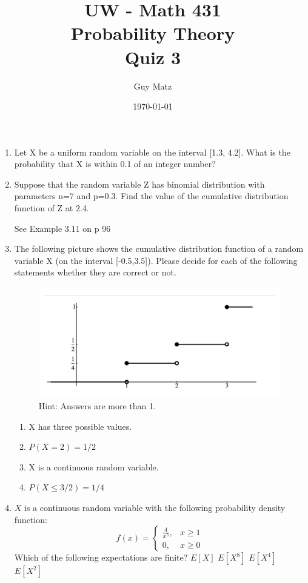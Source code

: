 \documentclass[10pt]{article}
\title{UW - Math 431 \\
Probability Theory \\
Quiz 3}
\author{Guy Matz}
\date{\today}
\begin{document}
\maketitle
\begin{enumerate}

  \item Let X be a uniform random variable on the interval [1.3, 4.2]. What is the probability that X is within 0.1 of an integer number?

\newpage
  \item Suppose that the random variable Z has binomial distribution with parameters n=7 and p=0.3. Find the value of the cumulative distribution function of Z at 2.4.

    See Example 3.11 on p 96

\newpage
  \item The following picture shows the cumulative distribution function of a random variable X (on the interval [-0.5,3.5]). Please decide for each of the following statements whether they are correct or not.
    \begin{figure}
      \includegraphics[width=\linewidth]{quiz3-q3.png}
      \caption{Hint: Answers are more than 1.}
    \end{figure}

    \begin{enumerate}
      \item X has three possible values.
      \item  $P(X=2) = 1/2$
      \item X is a continuous random variable.
      \item  $P(X \leq 3/2) = 1/4$
    \end{enumerate}

\newpage
  \item $X$ is a continuous random variable with the following probability density function:
$$
f(x)= \begin{cases}\frac{4}{x^5}, & x \geq 1 \\ 0, & x \geq 0\end{cases}
$$
Which of the following expectations are finite?
$E[X]$
$E\left[X^8\right]$
$E\left[X^4\right]$
$E\left[X^2\right]$


\end{enumerate}
\end{document}
